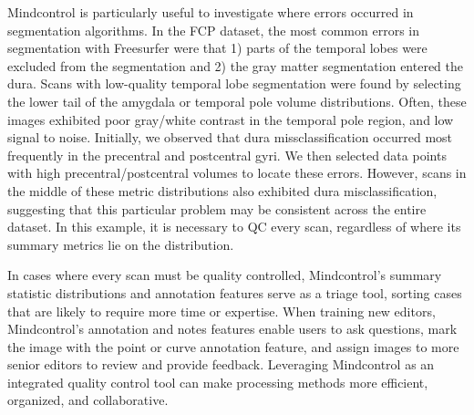Mindcontrol is particularly useful to investigate where errors occurred in segmentation algorithms. In the FCP dataset, the most common errors in segmentation with Freesurfer were that 1) parts of the temporal lobes were excluded from the segmentation and 2) the gray matter segmentation entered the dura. Scans with low-quality temporal lobe segmentation were found by selecting the lower tail of the amygdala or temporal pole volume distributions. Often, these images exhibited poor gray/white contrast in the temporal pole region, and low signal to noise. Initially, we observed that dura missclassification occurred most frequently in the precentral and postcentral gyri. We then selected data points with high precentral/postcentral volumes to locate these errors. However, scans in the middle of these metric distributions also exhibited dura misclassification, suggesting that this particular problem may be consistent across the entire dataset. In this example, it is necessary to QC every scan, regardless of where its summary metrics lie on the distribution.  

In cases where every scan must be quality controlled, Mindcontrol's summary statistic distributions and annotation features serve as a triage tool, sorting cases that are likely to require more time or expertise. When training new editors, Mindcontrol's annotation and notes features enable users to ask questions, mark the image with the point or curve annotation feature, and assign images to more senior editors to review and provide feedback. Leveraging Mindcontrol as an integrated quality control tool can make processing methods more efficient, organized, and collaborative.




